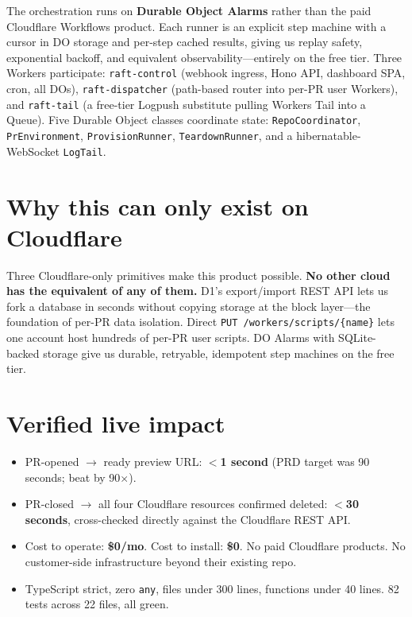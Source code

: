 \documentclass[11pt]{article}
\begin{document}
The orchestration runs on \textbf{Durable Object Alarms} rather than the paid Cloudflare Workflows product. Each runner is an explicit step machine with a cursor in DO storage and per-step cached results, giving us replay safety, exponential backoff, and equivalent observability---entirely on the free tier. Three Workers participate: \texttt{raft-control} (webhook ingress, Hono API, dashboard SPA, cron, all DOs), \texttt{raft-dispatcher} (path-based router into per-PR user Workers), and \texttt{raft-tail} (a free-tier Logpush substitute pulling Workers Tail into a Queue). Five Durable Object classes coordinate state: \texttt{RepoCoordinator}, \texttt{PrEnvironment}, \texttt{ProvisionRunner}, \texttt{TeardownRunner}, and a hibernatable-WebSocket \texttt{LogTail}.

\section*{Why this can only exist on Cloudflare}

Three Cloudflare-only primitives make this product possible. \textbf{No other cloud has the equivalent of any of them.} D1's export/import REST API lets us fork a database in seconds without copying storage at the block layer---the foundation of per-PR data isolation. Direct \texttt{PUT /workers/scripts/\{name\}} lets one account host hundreds of per-PR user scripts. DO Alarms with SQLite-backed storage give us durable, retryable, idempotent step machines on the free tier.

\section*{Verified live impact}

\begin{itemize}
  \item PR-opened $\rightarrow$ ready preview URL: \textbf{$<$1 second} (PRD target was 90 seconds; beat by 90$\times$).
  \item PR-closed $\rightarrow$ all four Cloudflare resources confirmed deleted: \textbf{$<$30 seconds}, cross-checked directly against the Cloudflare REST API.
  \item Cost to operate: \textbf{\$0/mo}. Cost to install: \textbf{\$0}. No paid Cloudflare products. No customer-side infrastructure beyond their existing repo.
  \item TypeScript strict, zero \texttt{any}, files under 300 lines, functions under 40 lines. 82 tests across 22 files, all green.
\end{itemize}
\end{document}
